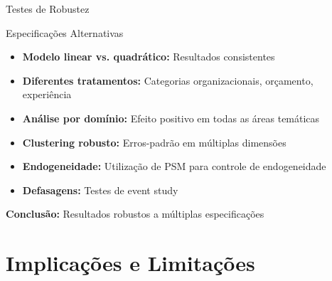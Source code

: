 \documentclass[aspectratio=169]{beamer}
\begin{document}
\begin{frame}{Testes de Robustez}
\begin{block}{Especificações Alternativas}
\begin{itemize}
\item \textbf{Modelo linear vs. quadrático:} Resultados consistentes
\item \textbf{Diferentes tratamentos:} Categorias organizacionais, orçamento, experiência
\item \textbf{Análise por domínio:} Efeito positivo em todas as áreas temáticas
\item \textbf{Clustering robusto:} Erros-padrão em múltiplas dimensões
\item \textbf{Endogeneidade:} Utilização de PSM para controle de endogeneidade
\item \textbf{Defasagens:} Testes de event study
\end{itemize}
\end{block}

\vspace{0.3cm}

\textbf{Conclusão:} Resultados robustos a múltiplas especificações
\end{frame}


\section{Implicações e Limitações}
\end{document}
